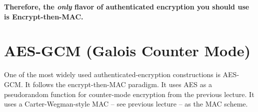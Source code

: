 %
%

\vspace{0.05in}

\textbf{Therefore, the \emph{only} flavor of authenticated encryption you should use is Encrypt-then-MAC.}

\section{AES-GCM (Galois Counter Mode)}\label{sec:enc:gcm}
One of the most widely used authenticated-encryption constructions is AES-GCM.
It follows the encrypt-then-MAC paradigm.
It uses AES as a pseudorandom function for counter-mode encryption from the previous
lecture. %
It uses a Carter-Wegman-style MAC -- see previous lecture --
as the MAC scheme.

